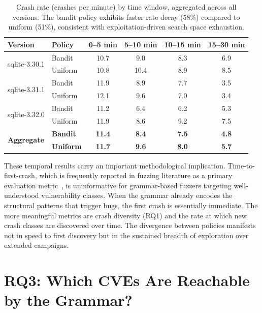 \begin{table}[htbp]
\caption{Crash rate (crashes per minute) by time window, aggregated across all versions. The bandit policy exhibits faster rate decay (58\%) compared to uniform (51\%), consistent with exploitation-driven search space exhaustion.}
\label{tab:rate}
\centering
\begin{tabular}{llcccc}
\toprule
\textbf{Version} & \textbf{Policy} & \textbf{0--5 min} & \textbf{5--10 min} & \textbf{10--15 min} & \textbf{15--30 min} \\
\midrule
\multirow{2}{*}{sqlite-3.30.1} & Bandit & 10.7 & 9.0 & 8.3 & 6.9 \\
                                & Uniform & 10.8 & 10.4 & 8.9 & 8.5 \\
\midrule
\multirow{2}{*}{sqlite-3.31.1} & Bandit & 11.9 & 8.9 & 7.7 & 3.5 \\
                                & Uniform & 12.1 & 9.6 & 7.0 & 3.4 \\
\midrule
\multirow{2}{*}{sqlite-3.32.0} & Bandit & 11.2 & 6.4 & 6.2 & 5.3 \\
                                & Uniform & 11.9 & 8.6 & 9.2 & 7.5 \\
\midrule
\multirow{2}{*}{\textbf{Aggregate}} & \textbf{Bandit} & \textbf{11.4} & \textbf{8.4} & \textbf{7.5} & \textbf{4.8} \\
                                     & \textbf{Uniform} & \textbf{11.7} & \textbf{9.6} & \textbf{8.0} & \textbf{5.7} \\
\bottomrule
\end{tabular}
\end{table}

These temporal results carry an important methodological implication. Time-to-first-crash, which is frequently reported in fuzzing literature as a primary evaluation metric~\cite{fuzzingsurvey}, is uninformative for grammar-based fuzzers targeting well-understood vulnerability classes. When the grammar already encodes the structural patterns that trigger bugs, the first crash is essentially immediate. The more meaningful metrics are crash diversity (RQ1) and the rate at which new crash classes are discovered over time. The divergence between policies manifests not in speed to first discovery but in the sustained breadth of exploration over extended campaigns.


\section{RQ3: Which CVEs Are Reachable by the Grammar?}
\label{sec:rq3}

